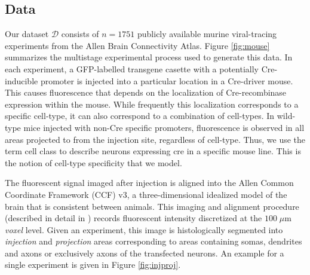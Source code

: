 \newpage

\subsection{Data}

Our dataset $\mathcal D$ consists of $n=1751$ publicly available murine viral-tracing experiments from the Allen Brain Connectivity Atlas.
Figure \ref{fig:mouse} summarizes the multistage experimental process used to generate this data.
In each experiment, a GFP-labelled transgene casette with a potentially Cre-inducible promoter is injected into a particular location in a Cre-driver mouse.
This causes fluorescence that depends on the localization of Cre-recombinase expression within the mouse.
While frequently this localization corresponds to a specific cell-type, it can also correspond to a combination of cell-types.
In wild-type mice injected with non-Cre specific promoters, fluorescence is observed in all areas projected to from the injection site, regardless of cell-type.
Thus, we use the term cell class to describe neurons expressing cre in a specific mouse line.
This is the notion of cell-type specificity that we model.

The fluorescent signal imaged after injection is aligned into the Allen Common Coordinate Framework (CCF) v3, a three-dimensional idealized model of the brain that is consistent between animals.
This imaging and alignment procedure (described in detail in \citep{Harris2019-mr}) records fluorescent intensity discretized at the $100 \; \mu$m \textit{voxel} level. 
Given an experiment, this image is histologically segmented into \textit{injection} and \textit{projection} areas corresponding to areas containing somas, dendrites and axons or exclusively axons of the transfected neurons.
An example for a single experiment is given in Figure \ref{fig:injproj}.

